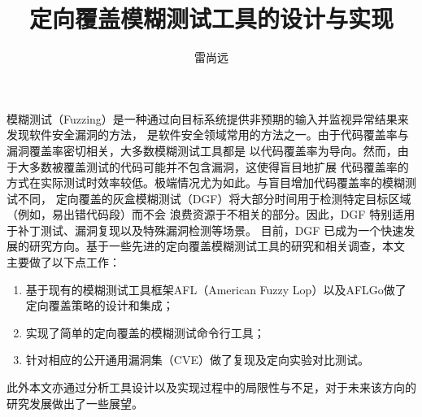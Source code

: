\documentclass[bachelor]{njupthesis}
\title{定向覆盖模糊测试工具的设计与实现}
\author{雷尚远}
\begin{document}
\makecover

\begin{chineseabstract}
模糊测试（Fuzzing）是一种通过向目标系统提供非预期的输入并监视异常结果来发现软件安全漏洞的方法，
是软件安全领域常用的方法之一。由于代码覆盖率与漏洞覆盖率密切相关，大多数模糊测试工具都是
以代码覆盖率为导向。然而，由于大多数被覆盖测试的代码可能并不包含漏洞，这使得盲目地扩展
代码覆盖率的方式在实际测试时效率较低。极端情况尤为如此。与盲目增加代码覆盖率的模糊测试不同，
定向覆盖的灰盒模糊测试（DGF）将大部分时间用于检测特定目标区域（例如，易出错代码段）而不会
浪费资源于不相关的部分。因此，DGF 特别适用于补丁测试、漏洞复现以及特殊漏洞检测等场景。
目前，DGF 已成为一个快速发展的研究方向。基于一些先进的定向覆盖模糊测试工具的研究和相关调查，本文
主要做了以下点工作：
\begin{enumerate}[label=(\arabic*)]
	\item 基于现有的模糊测试工具框架AFL（American Fuzzy Lop）以及AFLGo做了定向覆盖策略的设计和集成；
	\item 实现了简单的定向覆盖的模糊测试命令行工具；
	\item 针对相应的公开通用漏洞集（CVE）做了复现及定向实验对比测试。
\end{enumerate}
此外本文亦通过分析工具设计以及实现过程中的局限性与不足，对于未来该方向的研究发展做出了一些展望。

\end{chineseabstract}
\end{document}
